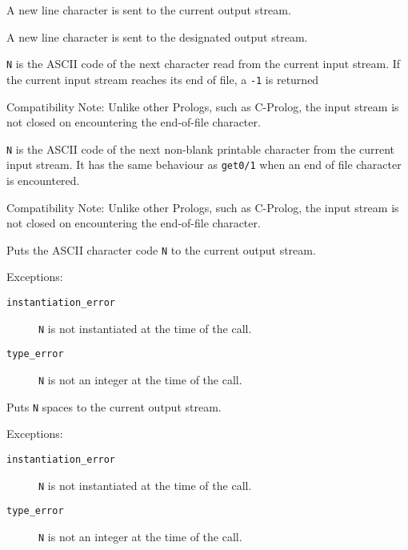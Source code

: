 \begin{description}
    A new line character is sent to the current output stream.

    A new line character is sent to the designated output stream.

    {\tt N} is the ASCII code of the next character read from the current 
    input stream. If the current input stream reaches its end of file,
    a {\tt -1} is returned 

    Compatibility Note:  Unlike other Prologs, such as C-Prolog, the input 
    stream is not closed on encountering the end-of-file character.

    {\tt N} is the ASCII code of the next non-blank printable character
    from the current input stream. It has the same behaviour as {\tt get0/1}
    when an end of file character is encountered.

    Compatibility Note:  Unlike other Prologs, such as C-Prolog, the input 
    stream is not closed on encountering the end-of-file character.

    Puts the ASCII character code {\tt N} to the current output stream.

    Exceptions:
    \begin{description}
    \item[{\tt instantiation\_error}]
	{\tt N} is not instantiated at the time of the call.
    \item[{\tt type\_error}]
	{\tt N} is not an integer at the time of the call.
    \end{description}

    Puts {\tt N} spaces to the current output stream. 

    Exceptions:
    \begin{description}
    \item[{\tt instantiation\_error}]
	{\tt N} is not instantiated at the time of the call.
    \item[{\tt type\_error}]
	{\tt N} is not an integer at the time of the call.
    \end{description}
\end{description}

